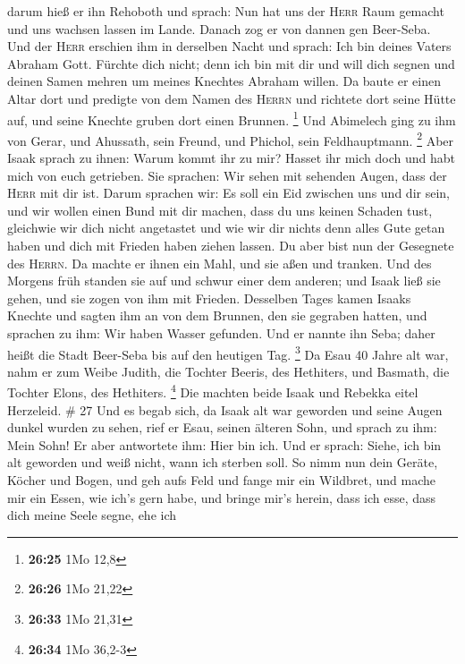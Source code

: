 darum hieß er ihn Rehoboth und sprach: Nun hat uns der \textsc{Herr}
Raum gemacht und uns wachsen lassen im Lande.  Danach zog
er von dannen gen Beer-Seba.  Und der \textsc{Herr}
erschien ihm in derselben Nacht und sprach: Ich bin deines Vaters
Abraham Gott. Fürchte dich nicht; denn ich bin mit dir und will dich
segnen und deinen Samen mehren um meines Knechtes Abraham willen.
 Da baute er einen Altar dort und predigte von dem Namen
des \textsc{Herrn} und richtete dort seine Hütte auf, und seine Knechte
gruben dort einen Brunnen. \footnote{\textbf{26:25} 1Mo 12,8}
 Und Abimelech ging zu ihm von Gerar, und Ahussath, sein
Freund, und Phichol, sein Feldhauptmann. \footnote{\textbf{26:26} 1Mo
  21,22}  Aber Isaak sprach zu ihnen: Warum kommt ihr zu
mir? Hasset ihr mich doch und habt mich von euch getrieben.
 Sie sprachen: Wir sehen mit sehenden Augen, dass der
\textsc{Herr} mit dir ist. Darum sprachen wir: Es soll ein Eid zwischen
uns und dir sein, und wir wollen einen Bund mit dir machen,
 dass du uns keinen Schaden tust, gleichwie wir dich
nicht angetastet und wie wir dir nichts denn alles Gute getan haben und
dich mit Frieden haben ziehen lassen. Du aber bist nun der Gesegnete des
\textsc{Herrn}.  Da machte er ihnen ein Mahl, und sie
aßen und tranken.  Und des Morgens früh standen sie auf
und schwur einer dem anderen; und Isaak ließ sie gehen, und sie zogen
von ihm mit Frieden.  Desselben Tages kamen Isaaks
Knechte und sagten ihm an von dem Brunnen, den sie gegraben hatten, und
sprachen zu ihm: Wir haben Wasser gefunden.  Und er
nannte ihn Seba; daher heißt die Stadt Beer-Seba bis auf den heutigen
Tag. \footnote{\textbf{26:33} 1Mo 21,31}  Da Esau 40
Jahre alt war, nahm er zum Weibe Judith, die Tochter Beeris, des
Hethiters, und Basmath, die Tochter Elons, des Hethiters. \footnote{\textbf{26:34}
  1Mo 36,2-3}  Die machten beide Isaak und Rebekka eitel
Herzeleid. \# 27  Und es begab sich, da Isaak alt war
geworden und seine Augen dunkel wurden zu sehen, rief er Esau, seinen
älteren Sohn, und sprach zu ihm: Mein Sohn! Er aber antwortete ihm: Hier
bin ich.  Und er sprach: Siehe, ich bin alt geworden und
weiß nicht, wann ich sterben soll.  So nimm nun dein
Geräte, Köcher und Bogen, und geh aufs Feld und fange mir ein Wildbret,
 und mache mir ein Essen, wie ich's gern habe, und bringe
mir's herein, dass ich esse, dass dich meine Seele segne, ehe ich

